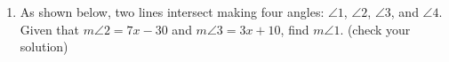 \documentclass[12pt, twoside]{article}
\begin{document}
\begin{enumerate}
\item As shown below, two lines intersect making four angles: $\angle 1$, $\angle 2$, $\angle 3$, and $\angle 4$. Given that $m\angle 2= 7x-30$ and $m\angle 3=3x+10$, find $m\angle 1$. (check your solution)
    \begin{flushright}
    \end{flushright} \vspace{2cm} 


\end{enumerate}
\end{document}
